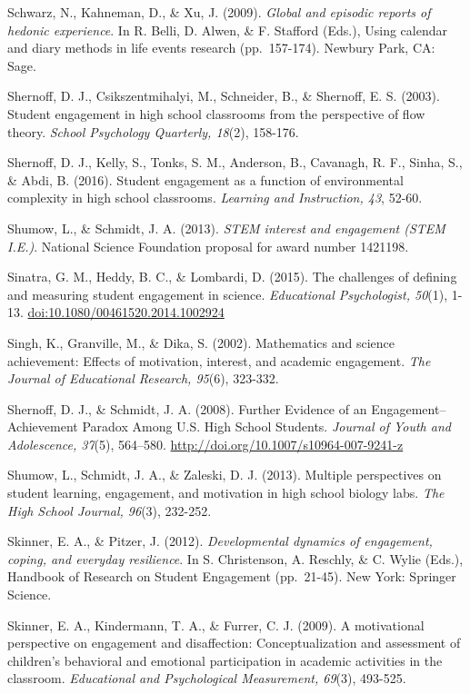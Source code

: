 \documentclass[]{msu-thesis}
\theoremstyle{definition}
\theoremstyle{definition}
\theoremstyle{definition}
\theoremstyle{remark}
\begin{document}
Schwarz, N., Kahneman, D., \& Xu, J. (2009). \emph{Global and episodic
reports of hedonic experience}. In R. Belli, D. Alwen, \& F. Stafford
(Eds.), Using calendar and diary methods in life events research
(pp.~157-174). Newbury Park, CA: Sage.

Shernoff, D. J., Csikszentmihalyi, M., Schneider, B., \& Shernoff, E. S.
(2003). Student engagement in high school classrooms from the
perspective of flow theory. \emph{School Psychology Quarterly, 18}(2),
158-176.

Shernoff, D. J., Kelly, S., Tonks, S. M., Anderson, B., Cavanagh, R. F.,
Sinha, S., \& Abdi, B. (2016). Student engagement as a function of
environmental complexity in high school classrooms. \emph{Learning and
Instruction, 43}, 52-60.

Shumow, L., \& Schmidt, J. A. (2013). \emph{STEM interest and engagement
(STEM I.E.)}. National Science Foundation proposal for award number
1421198.

Sinatra, G. M., Heddy, B. C., \& Lombardi, D. (2015). The challenges of
defining and measuring student engagement in science. \emph{Educational
Psychologist, 50}(1), 1-13. \url{doi:10.1080/00461520.2014.1002924}

Singh, K., Granville, M., \& Dika, S. (2002). Mathematics and science
achievement: Effects of motivation, interest, and academic engagement.
\emph{The Journal of Educational Research, 95}(6), 323-332.

Shernoff, D. J., \& Schmidt, J. A. (2008). Further Evidence of an
Engagement--Achievement Paradox Among U.S. High School Students.
\emph{Journal of Youth and Adolescence, 37}(5), 564--580.
\url{http://doi.org/10.1007/s10964-007-9241-z}

Shumow, L., Schmidt, J. A., \& Zaleski, D. J. (2013). Multiple
perspectives on student learning, engagement, and motivation in high
school biology labs. \emph{The High School Journal, 96}(3), 232-252.

Skinner, E. A., \& Pitzer, J. (2012). \emph{Developmental dynamics of
engagement, coping, and everyday resilience}. In S. Christenson, A.
Reschly, \& C. Wylie (Eds.), Handbook of Research on Student Engagement
(pp.~21-45). New York: Springer Science.

Skinner, E. A., Kindermann, T. A., \& Furrer, C. J. (2009). A
motivational perspective on engagement and disaffection:
Conceptualization and assessment of children's behavioral and emotional
participation in academic activities in the classroom. \emph{Educational
and Psychological Measurement, 69}(3), 493-525.
\end{document}

